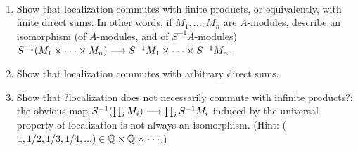 \begin{exr}\ 
\begin{enumerate}[label=(\alph*)]
\item Show that localization commutes with finite products, or equivalently, with
finite direct sums. In other words, if $M_1,...,M_n$ are $A$-modules, describe an isomorphism (of $A$-modules, and of $S^{-1}A$-modules) $S^{-1}(M_1 \times\cdot\cdot\cdot\times M_n) \longrightarrow S^{-1}M_1 \times
\cdot\cdot \cdot\times S^{-1}M_n$.
\item  Show that localization commutes with arbitrary direct sums.
\item Show that ?localization does not necessarily commute with infinite products?:
the obvious map $S^{-1}(\prod_i M_i) \longrightarrow  \prod_i S^{-1}M_i$ induced by the universal property of
localization is not always an isomorphism. (Hint: ($1, 1/2, 1/3, 1/4,... ) \in \mathbb Q\times\mathbb Q \times \cdot\cdot\cdot$.)
\end{enumerate}
\end{exr}
